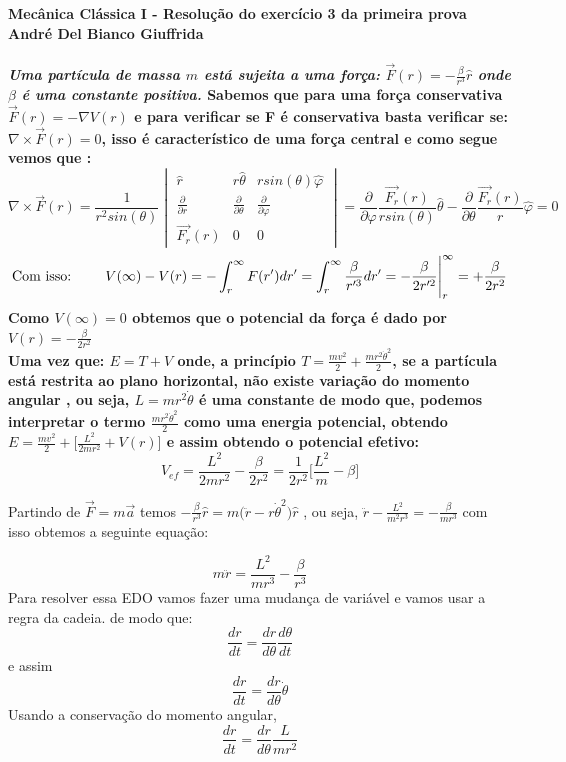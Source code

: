 \documentclass[a4paper,12pt]{exam}
\begin{document}
	\begingroup 
	  \bf Mecânica Clássica I - Resolução do exercício 3 da primeira prova\\
	  \indent André Del Bianco Giuffrida
	\endgroup
	\\ 
	\\ 
	\indent \textit{ Uma partícula de massa $m$ está sujeita a uma força:}
		$ \vec{F}(r)= -\frac{\beta}{r^3}\hat{r} $ \textit{ onde $\beta$ é uma constante positiva.}
		\indent Sabemos que para uma força conservativa $\vec{F}(r)= - \nabla V(r)$ e para verificar se F é conservativa basta verificar se: $\nabla \times \vec{F}(r) = 0$, isso é característico de uma força central e como segue vemos que :
		\[ \nabla \times \vec{F}(r) = \frac{1}{r^2 sin(\theta)}
			\begin{vmatrix}
				\hat{r} & r \hat{\theta} & rsin(\theta)\hat{\varphi} \\
				\frac{\partial}{\partial r} & \frac{\partial}{\partial \theta} & \frac{\partial}{\partial \varphi} \\
				\vec{F_r}(r) & 0 & 0 
			\end{vmatrix}
		= \frac{\partial}{\partial \varphi} \frac{\vec{F_r}(r)}{r sin(\theta)}\hat{\theta} -  \frac{\partial}{\partial \theta} \frac{\vec{F_r}(r)}{r} \hat{\varphi} = 0
		\] 
		\[ \text{Com isso: \quad \quad} V(\infty) - V(r) = - \int_{r}^{\infty} F(r')dr' = \int_{r}^{\infty} \frac{\beta}{r'^3} dr' = -\frac{\beta}{2r'^2} \Bigg|_{r}^{\infty} = +\frac{\beta}{2r^2}\]
		Como $V(\infty) = 0$ obtemos que o potencial da força é dado por $ V(r) = -\frac{\beta}{2r^2} $
		\\
		Uma vez que: $E = T + V$ onde, a princípio $T = \frac{mv^2}{2} + \frac{mr^2\dot\theta^2}{2}$, se a partícula está restrita ao plano horizontal, não existe variação do momento angular , ou seja, $L = m r^2 \dot\theta$ é uma constante de modo que, podemos interpretar o termo $\frac{mr^2\dot\theta^2}{2}$ como uma energia potencial, obtendo $E = \frac{mv^2}{2} + \big[\frac{ L^2 }{2mr^2} + V(r) \big]$ e assim obtendo o potencial efetivo:
		\[ V_{ef} = \frac{ L^2 }{2mr^2} - \frac{\beta}{2r^2}  = \frac{1}{2r^2} \Bigg[\frac{L^2}{m} - \beta \Bigg] \]
		
		Partindo de $\vec{F} = m\vec{a}$ temos $-\frac{\beta}{r^3}\hat{r} = m \big(\ddot{r} - r\dot{\theta}^2 \big)\hat{r} $ , ou seja, $ \ddot{r} - \frac{L^2}{m^2 r^3} = -\frac{\beta}{mr^3}$ com isso obtemos a seguinte equação:
		
		\[ m\ddot{r} = \frac{L^2}{mr^3} - \frac{\beta}{r^3} \]
		Para resolver essa EDO vamos fazer uma mudança de variável e vamos usar a regra da cadeia. de modo que:
		\[\frac{dr}{dt} = \frac{dr}{d\theta}\frac{d\theta}{dt} \]
		e assim \[\frac{dr}{dt} = \frac{dr}{d\theta}\dot{\theta} \]
		Usando a conservação do momento angular, 
		\[ \frac{dr}{dt} = \frac{dr}{d\theta}\frac{L}{mr^2} \] 
		
\end{document}
